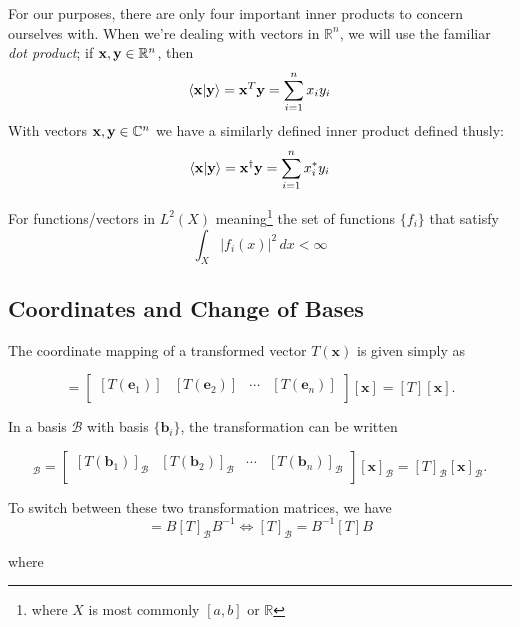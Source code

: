 \documentclass[a4paper]{article}
\numberwithin{equation}{subsection}
\theoremstyle{definition}
\theoremstyle{remark}
\newcommand{\Reals}{\mathbb{R}}
\newcommand{\Complex}{\mathbb{C}}
\newcommand{\ve}[1]{
	\mathbf{#1}
}
\newcommand{\cvb}[1]{
	[\mathbf{#1}]
}
\newcommand{\inv}[1]{
	{#1}^{-1}
}
\begin{document}
For our purposes, there are only four important inner products to concern ourselves with. When we're dealing with vectors in $\Reals^n$, we will use the familiar \textit{dot product}; if $\vb{x}, \vb{y} \in \Reals^n$, then 
\begin{equation}
\braket{\vb{x}}{\vb{y}} = \vb{x}^T \vb{y} = \sum_{i=1}^n x_i y_i
\end{equation}
With vectors  $\vb{x}, \vb{y} \in \Complex^n$ we have a similarly defined inner product defined thusly:
\begin{equation}
\braket{\vb{x}}{\vb{y}} = \vb{x}^\dagger \vb{y} = \sum_{i=1}^n x_i^* y_i
\end{equation}

For functions/vectors in $L^2(X)$ meaning\footnote{where $X$ is most commonly $[a,b]$ or $\Reals$} the set of functions $\{f_i\}$ that satisfy 
\[
\int_X |f_i(x)|^2\, dx < \infty 
\]

\subsection{Coordinates and Change of Bases}

The coordinate mapping of a transformed vector $T(\ve{x})$ is given simply as

\begin{equation}
[T(\ve{x})] = 
\begin{bmatrix}
[T(\ve{e}_1)]&[T(\ve{e}_2)]&\cdots&[T(\ve{e}_n)]\\
\end{bmatrix}
\cvb{x} = [T]\cvb{x}.
\end{equation}

In a basis $\mathcal{B}$ with basis $\{\ve{b}_i\}$, the transformation can be written

\begin{equation}
[T(\ve{x})]_\mathcal{B} = 
\begin{bmatrix}
[T(\ve{b}_1)]_\mathcal{B}&[T(\ve{b}_2)]_\mathcal{B}&\cdots&[T(\ve{b}_n)]_\mathcal{B}\\
\end{bmatrix}
\cvb{x}_\mathcal{B} = [T]_\mathcal{B}\cvb{x}_\mathcal{B}.
\end{equation}

To switch between these two transformation matrices, we have
\begin{equation}
[T]=B[T]_\mathcal{B}\inv{B} \iff [T]_\mathcal{B} = \inv{B}[T]B
\end{equation}

where
\end{document}
